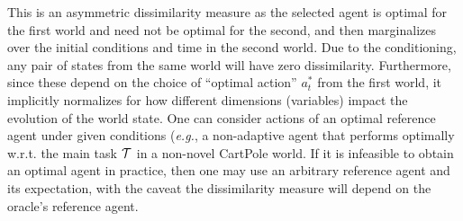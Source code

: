 This is an asymmetric dissimilarity measure as the selected agent is optimal for the first world and need not be optimal for the second, and then marginalizes over the initial conditions and time in the second world.
Due to the conditioning, any pair of states from the same world will have zero dissimilarity. Furthermore, since these depend on the choice of ``optimal action'' $a^*_{t}$ from the first world,  it implicitly normalizes for how different dimensions (variables) impact the evolution of the world state. 
One can consider actions of an optimal reference agent under given conditions (\textit{e.g.}, a non-adaptive agent that performs optimally w.r.t. the main task $\cal T$ in a non-novel CartPole world.
If it is infeasible to obtain an optimal agent in practice, then one may use an arbitrary reference agent and its expectation, with the caveat the dissimilarity measure will depend on the oracle's reference agent. 




